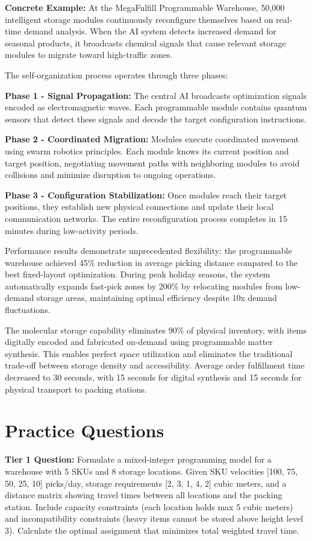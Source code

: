 \documentclass{article}
\begin{document}
\textbf{Concrete Example:} At the MegaFulfill Programmable Warehouse, 50,000 intelligent storage modules continuously reconfigure themselves based on real-time demand analysis. When the AI system detects increased demand for seasonal products, it broadcasts chemical signals that cause relevant storage modules to migrate toward high-traffic zones.

The self-organization process operates through three phases:

\textbf{Phase 1 - Signal Propagation:} The central AI broadcasts optimization signals encoded as electromagnetic waves. Each programmable module contains quantum sensors that detect these signals and decode the target configuration instructions.

\textbf{Phase 2 - Coordinated Migration:} Modules execute coordinated movement using swarm robotics principles. Each module knows its current position and target position, negotiating movement paths with neighboring modules to avoid collisions and minimize disruption to ongoing operations.

\textbf{Phase 3 - Configuration Stabilization:} Once modules reach their target positions, they establish new physical connections and update their local communication networks. The entire reconfiguration process completes in 15 minutes during low-activity periods.

Performance results demonstrate unprecedented flexibility: the programmable warehouse achieved 45\% reduction in average picking distance compared to the best fixed-layout optimization. During peak holiday seasons, the system automatically expands fast-pick zones by 200\% by relocating modules from low-demand storage areas, maintaining optimal efficiency despite 10x demand fluctuations.

The molecular storage capability eliminates 90\% of physical inventory, with items digitally encoded and fabricated on-demand using programmable matter synthesis. This enables perfect space utilization and eliminates the traditional trade-off between storage density and accessibility. Average order fulfillment time decreased to 30 seconds, with 15 seconds for digital synthesis and 15 seconds for physical transport to packing stations.

\section{Practice Questions}

\textbf{Tier 1 Question:} Formulate a mixed-integer programming model for a warehouse with 5 SKUs and 8 storage locations. Given SKU velocities [100, 75, 50, 25, 10] picks/day, storage requirements [2, 3, 1, 4, 2] cubic meters, and a distance matrix showing travel times between all locations and the packing station. Include capacity constraints (each location holds max 5 cubic meters) and incompatibility constraints (heavy items cannot be stored above height level 3). Calculate the optimal assignment that minimizes total weighted travel time.
\end{document}
